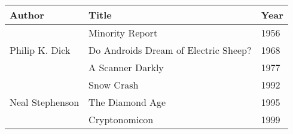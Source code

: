 \usepackage{multirow}
\usepackage{booktabs}
\begin{tabular}{lll}
	\toprule
	Author & Title & Year \\
	\midrule
	\multirow{3}{*}{Philip K. Dick} & Minority Report & 1956 \\
	\cmidrule{2-3}
	 & Do Androids Dream of Electric Sheep? & 1968 \\
	\cmidrule{2-3}
	 & A Scanner Darkly & 1977 \\
	\midrule
	\multirow{3}{*}{Neal Stephenson} & Snow Crash & 1992 \\
	\cmidrule{2-3}
	 & The Diamond Age & 1995 \\
	\cmidrule{2-3}
	 & Cryptonomicon & 1999 \\
	\bottomrule
\end{tabular}